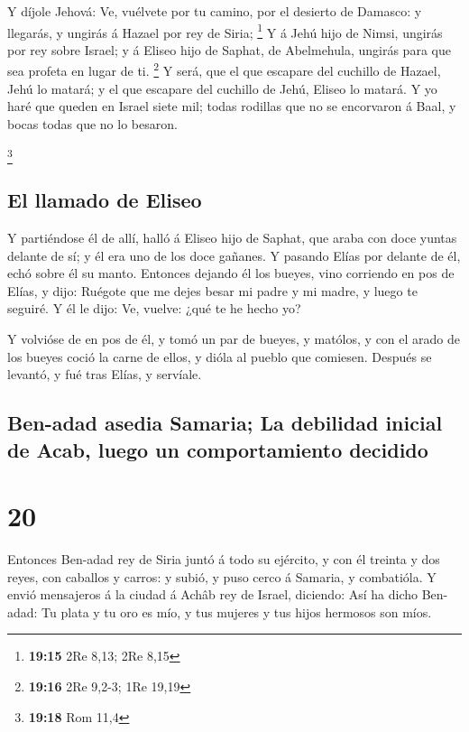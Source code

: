  Y díjole Jehová: Ve, vuélvete por tu camino, por el
desierto de Damasco: y llegarás, y ungirás á Hazael por rey de Siria;
\footnote{\textbf{19:15} 2Re 8,13; 2Re 8,15}  Y á Jehú hijo
de Nimsi, ungirás por rey sobre Israel; y á Eliseo hijo de Saphat, de
Abelmehula, ungirás para que sea profeta en lugar de ti. \footnote{\textbf{19:16}
  2Re 9,2-3; 1Re 19,19}  Y será, que el que escapare del
cuchillo de Hazael, Jehú lo matará; y el que escapare del cuchillo de
Jehú, Eliseo lo matará.  Y yo haré que queden en Israel
siete mil; todas rodillas que no se encorvaron á Baal, y bocas todas que
no lo besaron.

\footnote{\textbf{19:18} Rom 11,4}

\hypertarget{el-llamado-de-eliseo}{%
\subsection{El llamado de Eliseo}\label{el-llamado-de-eliseo}}

 Y partiéndose él de allí, halló á Eliseo hijo de Saphat,
que araba con doce yuntas delante de sí; y él era uno de los doce
gañanes. Y pasando Elías por delante de él, echó sobre él su manto.
 Entonces dejando él los bueyes, vino corriendo en pos de
Elías, y dijo: Ruégote que me dejes besar mi padre y mi madre, y luego
te seguiré. Y él le dijo: Ve, vuelve: ¿qué te he hecho yo?

 Y volvióse de en pos de él, y tomó un par de bueyes, y
matólos, y con el arado de los bueyes coció la carne de ellos, y dióla
al pueblo que comiesen. Después se levantó, y fué tras Elías, y
servíale.

\hypertarget{ben-adad-asedia-samaria-la-debilidad-inicial-de-acab-luego-un-comportamiento-decidido}{%
\subsection{Ben-adad asedia Samaria; La debilidad inicial de Acab, luego
un comportamiento
decidido}\label{ben-adad-asedia-samaria-la-debilidad-inicial-de-acab-luego-un-comportamiento-decidido}}

\hypertarget{section-19}{%
\section{20}\label{section-19}}

 Entonces Ben-adad rey de Siria juntó á todo su ejército, y
con él treinta y dos reyes, con caballos y carros: y subió, y puso cerco
á Samaria, y combatióla.  Y envió mensajeros á la ciudad á
Achâb rey de Israel, diciendo:  Así ha dicho Ben-adad: Tu
plata y tu oro es mío, y tus mujeres y tus hijos hermosos son míos.

